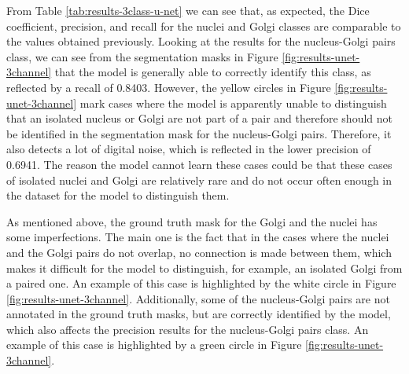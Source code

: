 \begin{table}[!htb]
\centering
\caption{Average metric values after testing the 3 class \ac{3D} U-Net model on two pre-processed microscopic images.}
\label{tab:results-3class-u-net}
\end{table}

From Table \ref{tab:results-3class-u-net} we can see that, as expected, the Dice coefficient, precision, and recall for the nuclei and Golgi classes are comparable to the values obtained previously. Looking at the results for the nucleus-Golgi pairs class, we can see from the segmentation masks in Figure \ref{fig:results-unet-3channel} that the model is generally able to correctly identify this class, as reflected by a recall of 0.8403. However, the yellow circles in Figure \ref{fig:results-unet-3channel} mark cases where the model is apparently unable to distinguish that an isolated nucleus or Golgi are not part of a pair and therefore should not be identified in the segmentation mask for the nucleus-Golgi pairs. Therefore, it also detects a lot of digital noise, which is reflected in the lower precision of 0.6941. The reason the model cannot learn these cases could be that these cases of isolated nuclei and Golgi are relatively rare and do not occur often enough in the dataset for the model to distinguish them.

As mentioned above, the ground truth mask for the Golgi and the nuclei has some imperfections. The main one is the fact that in the cases where the nuclei and the Golgi pairs do not overlap, no connection is made between them, which makes it difficult for the model to distinguish, for example, an isolated Golgi from a paired one. An example of this case is highlighted by the white circle in Figure \ref{fig:results-unet-3channel}. Additionally, some of the nucleus-Golgi pairs are not annotated in the ground truth masks, but are correctly identified by the model, which also affects the precision results for the nucleus-Golgi pairs class. An example of this case is highlighted by a green circle in Figure \ref{fig:results-unet-3channel}.

